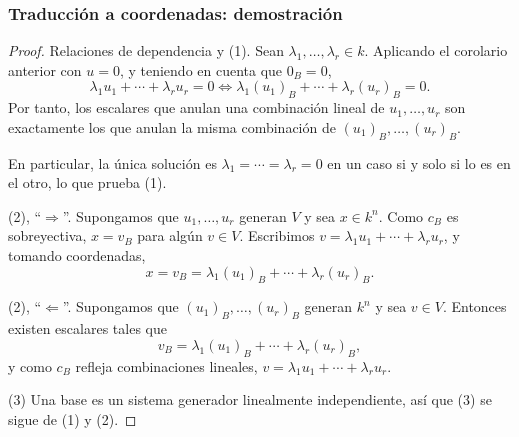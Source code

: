 \begin{frame}[allowframebreaks,t]
    \frametitle{Traducción a coordenadas: demostración}

    \begin{proof}
        \alert{Relaciones de dependencia y (1).}
        Sean \(\lambda_1,\ldots,\lambda_r\in k\). Aplicando el corolario
        anterior con \(u=0\), y teniendo en cuenta que \(0_B=0\),
        \[
            \lambda_1u_1+\cdots+\lambda_ru_r=0
            \iff
            \lambda_1(u_1)_B+\cdots+\lambda_r(u_r)_B=0.
        \]
        Por tanto, los escalares que anulan una combinación lineal de
        \(u_1,\ldots,u_r\) son exactamente los que anulan la misma
        combinación de \((u_1)_B,\ldots,(u_r)_B\).

        En particular, la única solución es
        \(\lambda_1=\cdots=\lambda_r=0\) en un caso si y solo si lo es en
        el otro, lo que prueba (1).

        \framebreak

        \alert{(2), ``\(\Rightarrow\)''.}
        Supongamos que \(u_1,\ldots,u_r\) generan \(V\) y sea
        \(x\in k^n\). Como \(c_B\) es sobreyectiva, \(x=v_B\) para algún
        \(v\in V\). Escribimos \(v=\lambda_1u_1+\cdots+\lambda_ru_r\), y
        tomando coordenadas,
        \[
            x=v_B=\lambda_1(u_1)_B+\cdots+\lambda_r(u_r)_B.
        \]

        \alert{(2), ``\(\Leftarrow\)''.}
        Supongamos que \((u_1)_B,\ldots,(u_r)_B\) generan \(k^n\) y sea
        \(v\in V\). Entonces existen escalares tales que
        \[
            v_B=\lambda_1(u_1)_B+\cdots+\lambda_r(u_r)_B,
        \]
        y como \(c_B\) refleja combinaciones lineales,
        \(v=\lambda_1u_1+\cdots+\lambda_ru_r\).

        \alert{(3)} Una base es un sistema generador linealmente
        independiente, así que (3) se sigue de (1) y (2).
    \end{proof}
\end{frame}


